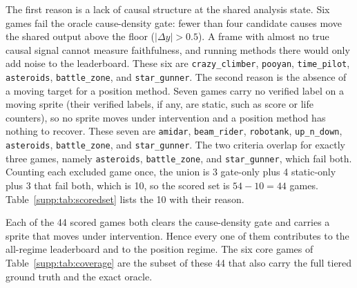 The first reason is a lack of causal structure at the shared analysis state. Six games fail
the oracle cause-density gate: fewer than four candidate causes move the shared output above
the floor ($|\Delta y|>0.5$). A frame with almost no true causal signal cannot measure
faithfulness, and running methods there would only add noise to the leaderboard. These six
are \texttt{crazy\_climber}, \texttt{pooyan},
\texttt{time\_pilot}, \texttt{asteroids}, \texttt{battle\_zone}, and \texttt{star\_gunner}. The
second reason is the absence of a moving target for a position method. Seven games carry no
verified label on a moving sprite (their verified labels, if any, are static, such as score or life counters), so no sprite moves under intervention
and a position method has nothing to recover. These seven are \texttt{amidar}, \texttt{beam\_rider},
\texttt{robotank}, \texttt{up\_n\_down}, \texttt{asteroids}, \texttt{battle\_zone}, and
\texttt{star\_gunner}. The two criteria overlap for exactly three games, namely
\texttt{asteroids}, \texttt{battle\_zone}, and \texttt{star\_gunner}, which fail both. Counting
each excluded game once, the union is 3 gate-only plus 4 static-only plus 3 that fail both,
which is 10, so the scored set is $54-10=44$ games. Table~\ref{supp:tab:scoredset}
lists the 10 with their reason.

Each of the 44 scored games both clears the cause-density gate and carries a sprite that moves
under intervention. Hence every one of them contributes to the all-regime leaderboard and to
the position regime. The six core games of Table~\ref{supp:tab:coverage} are the subset of
these 44 that also carry the full tiered ground truth and the exact oracle.

